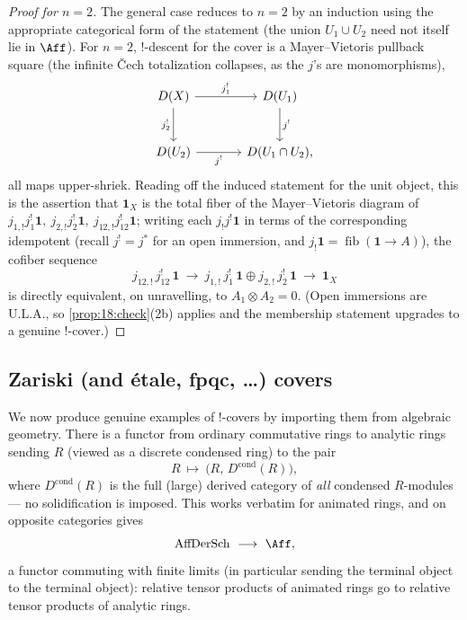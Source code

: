 \begin{proof}[Proof for $n=2$]
The general case reduces to $n=2$ by an induction using the appropriate
categorical form of the statement (the union $U_1\cup U_2$ need not itself lie in
$\Aff$). For $n=2$, $!$-descent for the cover is a Mayer--Vietoris pullback square
(the infinite \v Cech totalization collapses, as the $j$'s are monomorphisms),
\begin{equation*}
\begin{tikzcd}[column sep=large, row sep=large]
D(X) \arrow[r, "j_1^!"] \arrow[d, "j_2^!"'] & D(U_1) \arrow[d, "j^!"] \\
D(U_2) \arrow[r, "j^!"'] & D(U_1\cap U_2),
\end{tikzcd}
\end{equation*}
all maps upper-shriek. Reading off the induced statement for the unit object, this
is the assertion that $\mathbf 1_X$ is the total fiber of the Mayer--Vietoris
diagram of $j_{1,!}j_1^!\mathbf 1,\ j_{2,!}j_2^!\mathbf 1,\ j_{12,!}j_{12}^!\mathbf
1$; writing each $j_!j^!\mathbf 1$ in terms of the corresponding idempotent (recall
$j^!=j^*$ for an open immersion, and $j_!\mathbf 1=\operatorname{fib}(\mathbf 1\to
A)$), the cofiber sequence
\begin{equation*}
j_{12,!}\,j_{12}^!\,\mathbf 1\ \longrightarrow\ j_{1,!}\,j_1^!\,\mathbf 1\oplus j_{2,!}\,j_2^!\,\mathbf 1\ \longrightarrow\ \mathbf 1_X
\end{equation*}
is directly equivalent, on unravelling, to $A_1\otimes A_2=0$. (Open immersions are
U.L.A., so \cref{prop:18:check}(2b) applies and the membership statement upgrades to
a genuine $!$-cover.)
\end{proof}

\subsection{Zariski (and \'etale, fpqc, \dots) covers}
\label{subsec:18:zariski}

We now produce genuine examples of $!$-covers by importing them from algebraic
geometry. There is a functor from ordinary commutative rings to analytic rings
sending $R$ (viewed as a discrete condensed ring) to the pair
\begin{equation*}
R\ \longmapsto\ \bigl(R,\,D^{\mathrm{cond}}(R)\bigr),
\end{equation*}
where $D^{\mathrm{cond}}(R)$ is the full (large) derived category of \emph{all}
condensed $R$-modules --- no solidification is imposed. This works verbatim for
animated rings, and on opposite categories gives
\begin{equation}
\label{eq:18:affsch-to-aff}
\mathrm{AffDerSch}\ \longrightarrow\ \Aff,
\end{equation}
a functor commuting with finite limits (in particular sending the terminal object
to the terminal object): relative tensor products of animated rings go to relative
tensor products of analytic rings.

